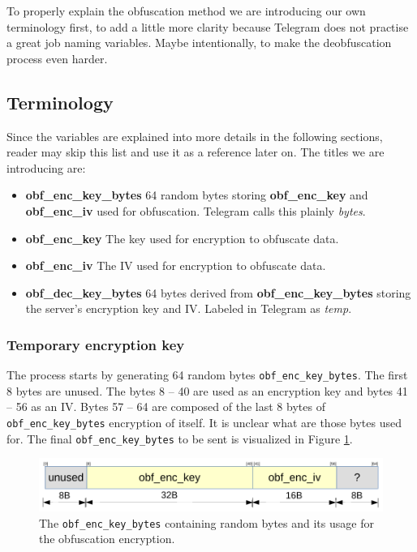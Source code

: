 \documentclass[thesis=M,english]{FITthesis}[2012/10/20]
\begin{document}
To properly explain the obfuscation method we are introducing our own terminology first, to add a little more clarity because Telegram does not practise a great job naming variables. Maybe intentionally, to make the deobfuscation process even harder.

\subsection{Terminology}

Since the variables are explained into more details in the following sections, reader may skip this list and use it as a reference later on. The titles we are introducing are:

\begin{itemize}
	\item \textbf{obf\_enc\_key\_bytes} 64 random bytes storing \textbf{obf\_enc\_key} and \textbf{obf\_enc\_iv} used for obfuscation. Telegram calls this plainly \emph{bytes}.
	\item \textbf{obf\_enc\_key} The key used for encryption to obfuscate data.
	\item \textbf{obf\_enc\_iv} The IV used for encryption to obfuscate data.
	\item \textbf{obf\_dec\_key\_bytes} 64 bytes derived from \textbf{obf\_enc\_key\_bytes} storing the server's encryption key and IV. Labeled in Telegram as \emph{temp}.
\end{itemize}

\subsubsection{Temporary encryption key}\label{code-obf-enc-key}

The process starts by generating 64 random bytes \texttt{obf\_enc\_key\_bytes}. The first 8 bytes are unused. The bytes 8 -- 40 are used as an encryption key and bytes 41 -- 56 as an IV. Bytes 57 -- 64 are composed of the last 8 bytes of \texttt{obf\_enc\_key\_bytes} encryption of itself. It is unclear what are those bytes used for. The final \texttt{obf\_enc\_key\_bytes} to be sent is visualized in Figure \ref{img:code-obfuscation-bytes-sent}.

\begin{figure}[htb]
	\centering
	\includegraphics[width=1\textwidth]{bytes-sent.pdf}
	\caption[Random bytes used for obfuscation]{The \texttt{obf\_enc\_key\_bytes} containing random bytes and its usage for the obfuscation encryption.}
	\label{img:code-obfuscation-bytes-sent}
\end{figure}
\end{document}
